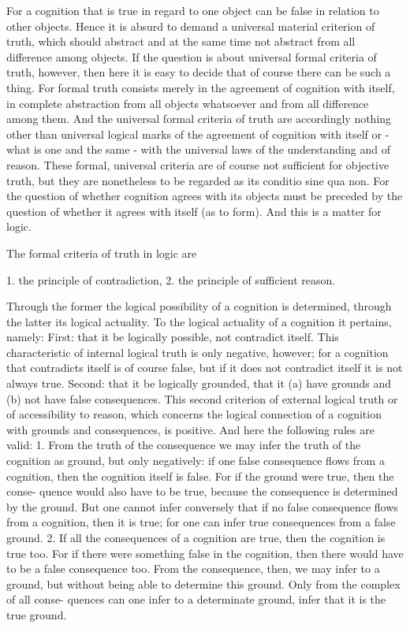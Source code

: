 For a cognition that is true in regard to one
object can be false in relation to other objects.
Hence it is absurd to demand a universal material criterion of truth,
which should abstract and at the same time not abstract from all difference among objects.
If the question is about universal formal criteria of truth, however, then
here it is easy to decide that of course there can be such a thing.
For formal truth consists merely in the agreement of cognition with itself,
in complete abstraction from all objects whatsoever and from all difference among them.
And the universal formal criteria of truth are accordingly nothing
other than universal logical marks of the agreement of cognition with itself
or - what is one and the same - with the universal laws of the understanding and of reason.
These formal, universal criteria are of course not sufficient for objective truth,
but they are nonetheless to be regarded as its conditio sine qua non.
For the question of whether cognition agrees with its objects
must be preceded by the question of whether it agrees with itself (as to form).
And this is a matter for logic.

The formal criteria of truth in logic are

1. the principle of contradiction,
2. the principle of sufficient reason.

Through the former the logical possibility of a cognition is determined,
through the latter its logical actuality.
To the logical actuality of a cognition it pertains, namely:
First: that it be logically possible, not contradict itself.
This characteristic of internal logical truth is only negative, however;
for a cognition that contradicts itself is of course false,
but if it does not contradict itself it is not always true.
Second: that it be logically grounded,
that it (a) have grounds and (b) not have false consequences.
This second criterion of external logical truth or of accessibility to reason,
which concerns the logical connection of a cognition with grounds and
consequences, is positive.
And here the following rules are valid:
1. From the truth of the consequence we may infer the truth of the cognition as
ground, but only negatively: if one false consequence flows from a cognition,
then the cognition itself is false. For if the ground were true, then the conse-
quence would also have to be true, because the consequence is determined by
the ground.
But one cannot infer conversely that if no false consequence flows from
a cognition, then it is true; for one can infer true consequences from a
false ground.
2. If all the consequences of a cognition are true, then the cognition is true too. For if
there were something false in the cognition, then there would have to be a
false consequence too.
From the consequence, then, we may infer to a ground, but without
being able to determine this ground. Only from the complex of all conse-
quences can one infer to a determinate ground, infer that it is the true
ground.

